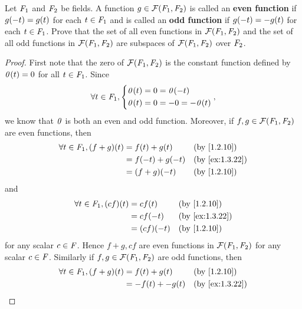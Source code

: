 \begin{ex}\label{ex:1.3.22}
  Let \(\mathit{F}_{1}\) and \(\mathit{F}_{2}\) be fields.
  A function \(g \in \fs{\F_{1}}{\F_{2}}\) is called an \textbf{even function} if \(g\p{-t} = g\p{t}\) for each \(t \in \mathit{F}_{1}\) and is called an \textbf{odd function} if \(g\p{-t} = -g\p{t}\) for each \(t \in \mathit{F}_{1}\).
  Prove that the set of all even functions in \(\fs{\F_{1}}{\F_{2}}\) and the set of all odd functions in \(\fs{\F_{1}}{\F_{2}}\) are subspaces of \(\fs{\F_{1}}{\F_{2}}\) over \(\mathit{F}_{2}\).
\end{ex}

\begin{proof}
  First note that the zero of \(\fs{\F_{1}}{\F_{2}}\) is the constant function defined by \(\zv\p{t} = 0\) for all \(t \in \mathit{F}_{1}\).
  Since
  \[
    \forall t \in \F_{1}, \begin{dcases}
      \zv\p{t} = 0 = \zv\p{-t} \\
      \zv\p{t} = 0 = -0 = -\zv\p{t}
    \end{dcases},
  \]
  we know that \(\mathit{0}\) is both an even and odd function.
  Moreover, if \(f, g \in \fs{\F_{1}}{\F_{2}}\) are even functions, then
  \begin{align*}
    \forall t \in \F_{1}, \p{f + g}\p{t} & = f\p{t} + g\p{t}   &  & \text{(by \cref{1.2.10})}    \\
                                         & = f\p{-t} + g\p{-t} &  & \text{(by \cref{ex:1.3.22})} \\
                                         & = \p{f + g}\p{-t}   &  & \text{(by \cref{1.2.10})}
  \end{align*}
  and
  \begin{align*}
    \forall t \in \F_{1}, \p{cf}\p{t} & = cf\p{t}      &  & \text{(by \cref{1.2.10})}    \\
                                      & = cf\p{-t}     &  & \text{(by \cref{ex:1.3.22})} \\
                                      & = \p{cf}\p{-t} &  & \text{(by \cref{1.2.10})}
  \end{align*}
  for any scalar \(c \in \mathit{F}\).
  Hence \(f + g, cf\) are even functions in \(\fs{\F_{1}}{\F_{2}}\) for any scalar \(c \in \mathit{F}\).
  Similarly if \(f, g \in \fs{\F_{1}}{\F_{2}}\) are odd functions, then
  \begin{align*}
    \forall t \in \F_{1}, \p{f + g}\p{t} & = f\p{t} + g\p{t}      &  & \text{(by \cref{1.2.10})}     \\
                                         & = -f\p{t} + -g\p{t}    &  & \text{(by \cref{ex:1.3.22})}  \\

\end{align*}
\end{proof}
